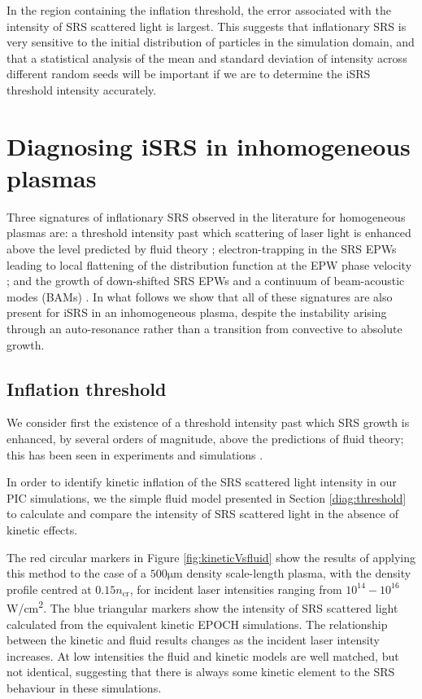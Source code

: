 In the region containing the inflation threshold, the error associated with the intensity of SRS scattered light is largest. This suggests that inflationary SRS is very sensitive to the initial distribution of particles in the simulation domain, and that a statistical analysis of the mean and standard deviation of intensity across different random seeds will be important if we are to determine the iSRS threshold intensity accurately.


\section{Diagnosing iSRS in inhomogeneous plasmas}\label{sec:signatures}
Three signatures of inflationary SRS observed in the literature for homogeneous plasmas are: a threshold intensity past which scattering of laser light is enhanced above the level predicted by fluid theory \cite{Vu2007}; electron-trapping in the SRS EPWs leading to local flattening of the distribution function at the EPW phase velocity \cite{Vu2002}; and the growth of down-shifted SRS EPWs and a continuum of beam-acoustic modes (BAMs) \cite{Yin2006}.
In what follows we show that all of these signatures are also present for iSRS in an inhomogeneous plasma, despite the instability arising through an auto-resonance rather than a transition from convective to absolute growth.

\subsection{Inflation threshold}
We consider first the existence of  a threshold intensity past which SRS growth is enhanced, by several
orders of magnitude, above the predictions of fluid theory; this has been seen in experiments \cite{Kline2006} and simulations \cite{Vu2002,Yin2006,Vu2007,Riconda2011}.

In order to identify kinetic inflation of the SRS scattered light intensity in our PIC simulations,
we the simple fluid model presented in Section \ref{diag:threshold} to calculate and compare the intensity of SRS scattered light in the absence of kinetic effects.

The red circular markers in Figure \ref{fig:kineticVsfluid} show the results of applying this method to the case of a $500\si{\micro\metre} $ density scale-length plasma, with the density profile centred at $0.15n_\mathrm{cr}$, for incident laser intensities ranging from $10^{14} - 10^{16}$\si{W/\centi\metre^2}. The blue triangular markers show the intensity of SRS scattered light calculated from the equivalent kinetic EPOCH simulations. The relationship between the kinetic and fluid results changes as the incident laser intensity increases. At low intensities the fluid and kinetic models are well matched, but not identical, suggesting that there is always some kinetic element to the SRS behaviour in these simulations.

